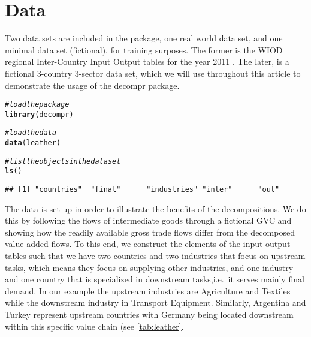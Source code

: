 \documentclass[a4paper]{article}\usepackage[]{graphicx}\usepackage[]{color}
\makeatletter
\newcommand{\hlcom}[1]{\textcolor[rgb]{0.678,0.584,0.686}{\textit{#1}}}%
\newcommand{\hlstd}[1]{\textcolor[rgb]{0.345,0.345,0.345}{#1}}%
\newcommand{\hlkwd}[1]{\textcolor[rgb]{0.737,0.353,0.396}{\textbf{#1}}}%
\newenvironment{kframe}{%
 \def\at@end@of@kframe{}%
 \ifinner\ifhmode%
  \def\at@end@of@kframe{\end{minipage}}%
  \begin{minipage}{\columnwidth}%
 \fi\fi%
 \def\FrameCommand##1{\hskip\@totalleftmargin \hskip-\fboxsep
 \colorbox{shadecolor}{##1}\hskip-\fboxsep
     \hskip-\linewidth \hskip-\@totalleftmargin \hskip\columnwidth}%
 \MakeFramed {\advance\hsize-\width
   \@totalleftmargin\z@ \linewidth\hsize
   \@setminipage}}%
 {\par\unskip\endMakeFramed%
 \at@end@of@kframe}
\newenvironment{knitrout}{}{} %
\makeatother
\begin{document}
\section{Data}
\label{sec:data}
Two data sets are included in the package, one real world data set, and one minimal data set (fictional), for training surposes.
The former is the WIOD regional Inter-Country Input Output tables for the year 2011 \parencite{timmer2012world}. 
The later, is a fictional 3-country 3-sector data set, which we will use throughout this article to demonstrate the usage of the decompr package.

\begin{knitrout}
\color{fgcolor}\begin{kframe}
\begin{alltt}
\hlcom{# load the package}
\hlkwd{library}\hlstd{(decompr)}
\end{alltt}
\end{kframe}
\end{knitrout}

\begin{knitrout}
\color{fgcolor}\begin{kframe}
\begin{alltt}
\hlcom{# load the data}
\hlkwd{data}\hlstd{(leather)}

\hlcom{# list the objects in the data set}
\hlkwd{ls}\hlstd{()}
\end{alltt}
\begin{verbatim}
## [1] "countries"  "final"      "industries" "inter"      "out"
\end{verbatim}
\end{kframe}
\end{knitrout}

The data is set up in order to illustrate the benefits of the decompositions.
We do this by following the flows of intermediate goods through a fictional GVC and showing how the readily available gross trade flows differ from the decomposed value added flows.
To this end, we construct the elements of the input-output tables such that we have two countries and two industries that focus on upstream tasks, which means they focus on supplying other industries, and one industry and one country that is specialized in downstream tasks,i.e.~it serves mainly final demand.
In our example the upstream industries are Agriculture and Textiles while the downstream industry in Transport Equipment.
Similarly, Argentina and Turkey represent upstream countries with Germany being located downstream within this specific value chain (see \cref{tab:leather}.
\end{document}
